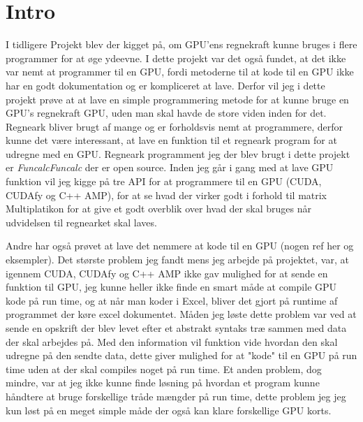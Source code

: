 \section{Intro}
I tidligere Projekt blev der kigget på, om GPU'ens regnekraft kunne bruges i flere programmer for at øge ydeevne. I dette projekt var det også fundet, at det ikke var nemt at programmer til en GPU, fordi metoderne til at kode til en GPU ikke har en godt dokumentation og er kompliceret at lave. Derfor vil jeg i dette projekt prøve at at lave en simple programmering metode for at kunne bruge en GPU's regnekraft GPU, uden man skal havde de store viden inden for det. Regneark bliver brugt af mange og er forholdsvis nemt at programmere, derfor kunne det være interessant, at lave en funktion til et regneark program for at udregne med en GPU. Regneark programment jeg der blev brugt i dette projekt er \textit{Funcalc}\textit{Funcalc} der er open source.
Inden jeg går i gang med at lave GPU funktion vil jeg kigge på tre API for at programmere til en GPU (CUDA, CUDAfy og C++ AMP), for at se hvad der virker godt i forhold til matrix Multiplatikon for at give et godt overblik over hvad der skal bruges når udvidelsen til regnearket skal laves.

Andre har også prøvet at lave det nemmere at kode til en GPU (nogen ref her og eksempler). Det største problem jeg fandt mens jeg arbejde på projektet, var, at igennem CUDA, CUDAfy og C++ AMP ikke gav mulighed for at sende en funktion til GPU, jeg kunne heller ikke finde en smart måde at compile GPU kode på run time, og at når man koder i Excel, bliver det gjort på runtime af programmet der køre excel dokumentet. Måden jeg løste dette problem var ved at sende en opskrift der blev levet efter et abstrakt syntaks træ sammen med data der skal arbejdes på. Med den information vil funktion vide hvordan den skal udregne på den sendte data, dette giver mulighed for at "kode" til en GPU på run time uden at der skal compiles noget på run time. Et anden problem, dog mindre, var at jeg ikke kunne finde løsning på hvordan et program kunne håndtere at bruge forskellige tråde mængder på run time, dette problem jeg jeg kun løst på en meget simple måde der også kan klare forskellige GPU korts.